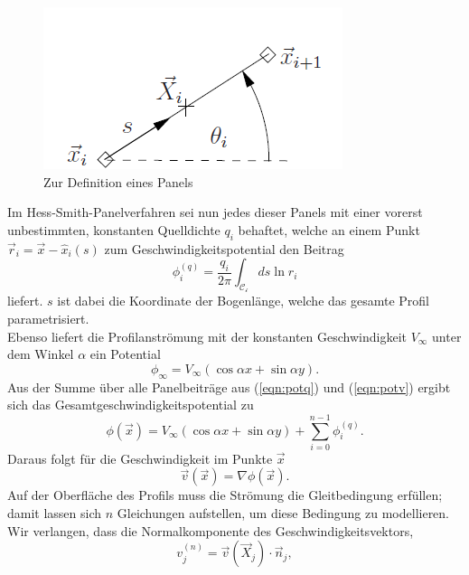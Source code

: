 \begin{figure}
\begin{center} \includegraphics[scale=0.5]{figures/panel.png} \end{center}
\caption{Zur Definition eines Panels}
\label{fig:panel}
\end{figure}

Im Hess-Smith-Panelverfahren sei nun jedes dieser Panels mit einer vorerst unbestimmten, konstanten Quelldichte $q_i$ behaftet, welche an einem Punkt $\vec r_i =  \vec x - \hat x_i(s)$ zum Geschwindigkeitspotential den Beitrag
\begin{equation}
\label{eqn:potq}
\phi_i^{(q)} =  \frac{q_i}{2 \pi } \int_{\mathcal{C_i}} ds \ln r_i
\end{equation}
liefert. $s$ ist dabei die Koordinate der Bogenlänge, welche das gesamte Profil parametrisiert. \\
Ebenso liefert die Profilanströmung mit der konstanten Geschwindigkeit $V_{\infty}$ unter dem Winkel $\alpha $ ein Potential
\begin{equation}
\label{eqn:potv}
\phi_{\infty} =  V_{\infty} (\cos \alpha x + \sin \alpha y).
\end{equation}
Aus der Summe über alle Panelbeiträge aus (\ref{eqn:potq}) und (\ref{eqn:potv}) ergibt sich das Gesamtgeschwindigkeitspotential zu
\begin{equation}
\label{eqn:potnovortex}
\phi(\vec x) =  V_{\infty} (\cos \alpha x + \sin \alpha y) + \sum_{i=0}^{n-1} \phi_i^{(q)}.
\end{equation}
Daraus folgt für die Geschwindigkeit im Punkte $\vec x$ 
\begin{equation}
\vec v ( \vec x) =  \nabla  \phi (\vec x).
\end{equation}
Auf der Oberfläche des Profils muss die Strömung die Gleitbedingung erfüllen; damit lassen sich $n$ Gleichungen aufstellen, um diese Bedingung zu modellieren. Wir verlangen, dass die Normalkomponente des Geschwindigkeitsvektors,
\begin{equation}
v_j^{(n)} =  \vec v(\vec X_j) \cdot \vec n_j,
\end{equation}
